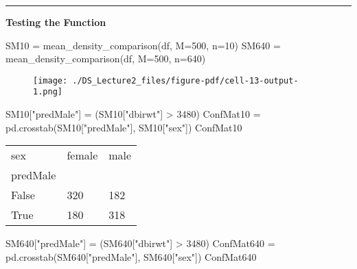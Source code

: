 \documentclass[
  letterpaper,
  DIV=11,
  numbers=noendperiod]{scrreprt}
\newenvironment{Shaded}{\begin{snugshade}}{\end{snugshade}}
\newcommand{\DecValTok}[1]{\textcolor[rgb]{0.68,0.00,0.00}{#1}}
\newcommand{\NormalTok}[1]{\textcolor[rgb]{0.00,0.23,0.31}{#1}}
\newcommand{\OperatorTok}[1]{\textcolor[rgb]{0.37,0.37,0.37}{#1}}
\newcommand{\StringTok}[1]{\textcolor[rgb]{0.13,0.47,0.30}{#1}}
\begin{document}
\begin{center}\rule{0.5\linewidth}{0.5pt}\end{center}

\textbf{Testing the Function}

\begin{Shaded}
\begin{Highlighting}[]
\NormalTok{SM10 }\OperatorTok{=}\NormalTok{ mean\_density\_comparison(df, M}\OperatorTok{=}\DecValTok{500}\NormalTok{, n}\OperatorTok{=}\DecValTok{10}\NormalTok{)}
\NormalTok{SM640 }\OperatorTok{=}\NormalTok{ mean\_density\_comparison(df, M}\OperatorTok{=}\DecValTok{500}\NormalTok{, n}\OperatorTok{=}\DecValTok{640}\NormalTok{)}
\end{Highlighting}
\end{Shaded}

\begin{figure}[H]

{\centering \texttt{[image: ./DS\_Lecture2\_files/figure-pdf/cell-13-output-1.png]}

}

\end{figure}

\begin{Shaded}
\begin{Highlighting}[]
\NormalTok{SM10[}\StringTok{"predMale"}\NormalTok{] }\OperatorTok{=}\NormalTok{ (SM10[}\StringTok{"dbirwt"}\NormalTok{] }\OperatorTok{\textgreater{}} \DecValTok{3480}\NormalTok{)}
\NormalTok{ConfMat10 }\OperatorTok{=}\NormalTok{ pd.crosstab(SM10[}\StringTok{"predMale"}\NormalTok{], SM10[}\StringTok{"sex"}\NormalTok{])}
\NormalTok{ConfMat10}
\end{Highlighting}
\end{Shaded}

\begin{longtable}[]{@{}lll@{}}
\toprule()
sex & female & male \\
predMale & & \\
\midrule()
\endhead
False & 320 & 182 \\
True & 180 & 318 \\
\bottomrule()
\end{longtable}

\begin{Shaded}
\begin{Highlighting}[]
\NormalTok{SM640[}\StringTok{"predMale"}\NormalTok{] }\OperatorTok{=}\NormalTok{ (SM640[}\StringTok{"dbirwt"}\NormalTok{] }\OperatorTok{\textgreater{}} \DecValTok{3480}\NormalTok{)}
\NormalTok{ConfMat640 }\OperatorTok{=}\NormalTok{ pd.crosstab(SM640[}\StringTok{"predMale"}\NormalTok{], SM640[}\StringTok{"sex"}\NormalTok{])}
\NormalTok{ConfMat640}
\end{Highlighting}
\end{Shaded}
\end{document}
